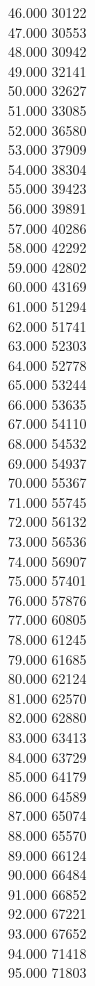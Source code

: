{ 46.000	30122 \\
 47.000	30553 \\
 48.000	30942 \\
 49.000	32141 \\
 50.000	32627 \\
 51.000	33085 \\
 52.000	36580 \\
 53.000	37909 \\
 54.000	38304 \\
 55.000	39423 \\
 56.000	39891 \\
 57.000	40286 \\
 58.000	42292 \\
 59.000	42802 \\
 60.000	43169 \\
 61.000	51294 \\
 62.000	51741 \\
 63.000	52303 \\
 64.000	52778 \\
 65.000	53244 \\
 66.000	53635 \\
 67.000	54110 \\
 68.000	54532 \\
 69.000	54937 \\
 70.000	55367 \\
 71.000	55745 \\
 72.000	56132 \\
 73.000	56536 \\
 74.000	56907 \\
 75.000	57401 \\
 76.000	57876 \\
 77.000	60805 \\
 78.000	61245 \\
 79.000	61685 \\
 80.000	62124 \\
 81.000	62570 \\
 82.000	62880 \\
 83.000	63413 \\
 84.000	63729 \\
 85.000	64179 \\
 86.000	64589 \\
 87.000	65074 \\
 88.000	65570 \\
 89.000	66124 \\
 90.000	66484 \\
 91.000	66852 \\
 92.000	67221 \\
 93.000	67652 \\
 94.000	71418 \\
 95.000	71803 \\
}
